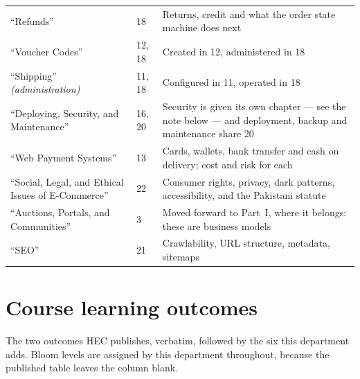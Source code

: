 \begin{longtable}{@{}L{6.4cm}L{2.0cm}L{6.6cm}@{}}
``Refunds'' & 18 & Returns, credit and what the order state machine does next \\
``Voucher Codes'' & 12, 18 & Created in 12, administered in 18 \\
``Shipping'' \emph{(administration)} & 11, 18 & Configured in 11, operated
in 18 \\
``Deploying, Security, and Maintenance'' & 16, 20 & Security is given its own
chapter --- see the note below --- and deployment, backup and maintenance
share 20 \\
``Web Payment Systems'' & 13 & Cards, wallets, bank transfer and cash on
delivery; cost and risk for each \\
``Social, Legal, and Ethical Issues of E-Commerce'' & 22 & Consumer rights,
privacy, dark patterns, accessibility, and the Pakistani statute \\
``Auctions, Portals, and Communities'' & 3 & Moved forward to Part~I, where it
belongs: these are business models \\
``SEO'' & 21 & Crawlability, URL structure, metadata, sitemaps \\
\bottomrule
\end{longtable}

\section*{Course learning outcomes}

The two outcomes HEC publishes, verbatim, followed by the six this department
adds. Bloom levels are assigned by this department throughout, because the
published table leaves the column blank.

